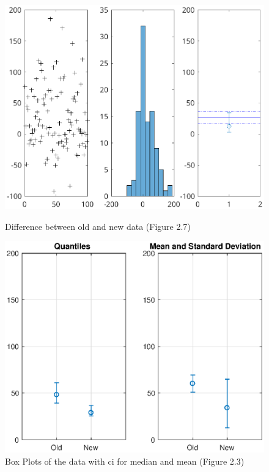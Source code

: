\documentclass[11pt,a4paper]{article}
\begin{document}
\begin{figure}[ht]
	\centering
	\begin{minipage}{0.45\textwidth}
		\centering
		\includegraphics[width=\textwidth]{ex1fig2_7}
		\caption{Difference between old and new data (Figure 2.7) }
		\label{fig:diff_exec}
	\end{minipage}
	\begin{minipage}{0.45\textwidth}
		\centering
		\includegraphics[width=\textwidth]{ex1fig2_3}
		\caption{Box Plots of the data with \gls{ci} for median and mean (Figure 2.3)}
		\label{fig:box_plots_exec}
	\end{minipage}
\end{figure}
\end{document}
